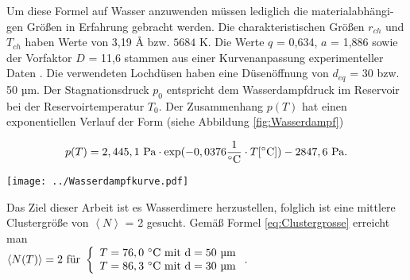 Um diese Formel auf Wasser anzuwenden müssen lediglich die materialabhängi-gen Größen in Erfahrung gebracht werden. Die charakteristischen Größen $r_{ch}$ und $T_{ch}$ haben Werte von 3,19 \AA{} bzw. $5684$ K. Die Werte $q$ = 0,634, $a$ = 1,886 sowie der Vorfaktor $D$ = 11,6 stammen aus einer Kurvenanpassung experimenteller Daten \cite{bobbert2002}. Die verwendeten Lochdüsen haben eine Düsenöffnung von $d_{eq}$ = 30 bzw. 50 µm. Der Stagnationsdruck $p_0$ entspricht dem Wasserdampfdruck im Reservoir bei der Reservoirtemperatur $T_0$. Der Zusammenhang $p(T)$ hat einen exponentiellen Verlauf der Form (siehe Abbildung \ref{fig:Wasserdampf})

\begin{equation} \label{eq:Clustergrosse}
p(T) = 2,445,1\ \textmd{Pa} \cdot \textmd{exp}(-0,0376 \frac{1}{^{\circ} \textmd{C}} \cdot T [^{\circ} \textmd{C}]) - 2847,6\ \textmd{Pa} .
\end{equation}

\begin{center}
\begin{minipage}{\linewidth}
\centering
\texttt{[image: ../Wasserdampfkurve.pdf]}%
 \label{fig:Wasserdampf}
\end{minipage} 
\end{center}

Das Ziel dieser Arbeit ist es Wasserdimere herzustellen, folglich ist eine mittlere Clustergröße von $\left \langle N \right\rangle$ = 2 gesucht. Gemäß Formel \ref{eq:Clustergrosse} erreicht man \\ $\left \langle N(T) \right\rangle = 2 \textmd{ für }
\left\{ %
   \begin{array}{l}
   T = 76,0\ ^{\circ} \textmd{C} \textmd{ mit d}= 50 \textmd{ µm} \\ 
   T = 86,3\ ^{\circ} \textmd{C} \textmd{ mit d}= 30 \textmd{ µm}
   \end{array}
   \right. .$\\ \\